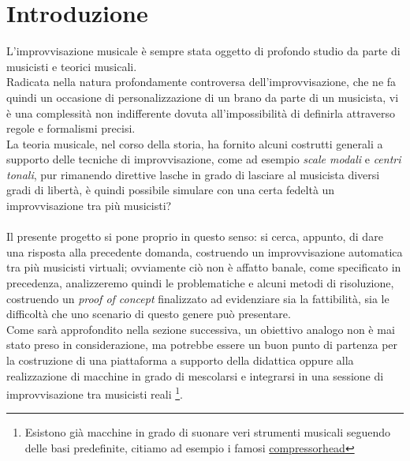 \section{Introduzione}
L'improvvisazione musicale è sempre stata oggetto di profondo studio da parte
di musicisti e teorici musicali.\\
Radicata nella natura profondamente controversa dell'improvvisazione,
che ne fa quindi un occasione di personalizzazione di un brano da parte di un musicista,
vi è una complessità non indifferente dovuta all'impossibilità di definirla
attraverso regole e formalismi precisi.\\
La teoria musicale, nel corso della storia, ha fornito alcuni costrutti generali
a supporto delle tecniche di improvvisazione, come ad esempio
\emph{scale modali} e \emph{centri tonali}, pur rimanendo direttive lasche
in grado di lasciare al musicista diversi gradi di libertà, è quindi possibile
simulare con una certa fedeltà un improvvisazione tra più musicisti?\\
\\
Il presente progetto si pone proprio in questo senso:
si cerca, appunto, di dare una risposta alla precedente domanda, costruendo un
improvvisazione automatica tra più musicisti virtuali; ovviamente ciò non è affatto
banale, come specificato in precedenza, analizzeremo quindi le problematiche
e alcuni metodi di risoluzione, costruendo un \emph{proof of concept} finalizzato
ad evidenziare sia la fattibilità, sia le difficoltà che uno scenario di questo
genere può presentare.\\
Come sarà approfondito nella sezione successiva, un obiettivo analogo
non è mai stato preso in considerazione, ma potrebbe essere
un buon punto di partenza per la costruzione di una piattaforma a supporto della
didattica oppure alla realizzazione di macchine in grado di mescolarsi e integrarsi
in una sessione di improvvisazione tra musicisti reali
\footnote{Esistono già macchine in grado di suonare veri strumenti musicali seguendo delle basi predefinite, citiamo ad esempio i famosi \href{http://compressorhead.rocks/}{compressorhead}}.
